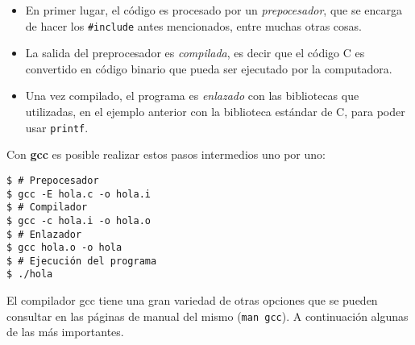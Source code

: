 \begin{itemize}
\item En primer lugar, el código es procesado por un \textit{prepocesador},
que se encarga de hacer los \lstinline!#include! antes mencionados, entre
muchas otras cosas.

\item La salida del preprocesador es \textit{compilada}, es decir que el
código C es convertido en código binario que pueda ser ejecutado por la
computadora.

\item Una vez compilado, el programa es \textit{enlazado} con las bibliotecas
que utilizadas, en el ejemplo anterior con la biblioteca estándar de C, para
poder usar \lstinline!printf!.
\end{itemize}

Con \textbf{gcc} es posible realizar estos pasos intermedios uno por uno:

\begin{verbatim}
$ # Prepocesador
$ gcc -E hola.c -o hola.i
$ # Compilador
$ gcc -c hola.i -o hola.o
$ # Enlazador
$ gcc hola.o -o hola
$ # Ejecución del programa
$ ./hola
\end{verbatim}

El compilador gcc tiene una gran variedad de otras opciones que se pueden
consultar en las páginas de manual del mismo (\verb!man gcc!).  A continuación
algunas de las más importantes.

